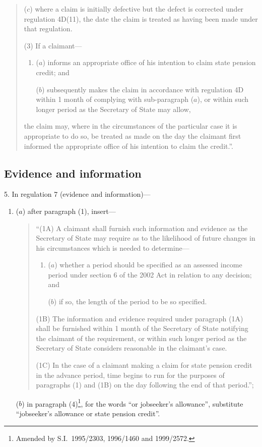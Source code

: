 \documentclass[12pt,a4paper]{article}
\begin{document}
\begin{quotation}
\begin{enumerate}
($c$) where a claim is initially defective but the defect is corrected under regulation 4D(11), the date the claim is treated as having been made under that regulation.
\end{enumerate}

(3) If a claimant—
\begin{enumerate}\item[]
($a$) informs an appropriate office of his intention to claim state pension credit; and

($b$) subsequently makes the claim in accordance with regulation 4D within 1 month of complying with sub-paragraph ($a$), or within such longer period as the Secretary of State may allow,
\end{enumerate}
the claim may, where in the circumstances of the particular case it is appropriate to do so, be treated as made on the day the claimant first informed the appropriate office of his intention to claim the credit.”.
\end{quotation}

\subsection[5. Evidence and information]{Evidence and information}

5.  In regulation 7 (evidence and information)—
\begin{enumerate}\item[]
($a$) after paragraph (1), insert—
\begin{quotation}
“(1A) A claimant shall furnish such information and evidence as the Secretary of State may require as to the likelihood of future changes in his circumstances which is needed to determine—
\begin{enumerate}\item[]
($a$) whether a period should be specified as an assessed income period under section 6 of the 2002 Act in relation to any decision; and

($b$) if so, the length of the period to be so specified.
\end{enumerate}

(1B) The information and evidence required under paragraph (1A) shall be furnished within 1 month of the Secretary of State notifying the claimant of the requirement, or within such longer period as the Secretary of State considers reasonable in the claimant’s case.

(1C) In the case of a claimant making a claim for state pension credit in the advance period, time begins to run for the purposes of paragraphs (1) and (1B) on the day following the end of that period.”;
\end{quotation}

($b$) in paragraph (4)\footnote{Amended by S.I.\ 1995/2303, 1996/1460 and 1999/2572.}, for the words “or jobseeker’s allowance”, substitute “jobseeker’s allowance or state pension credit”.
\end{enumerate}
\end{document}
